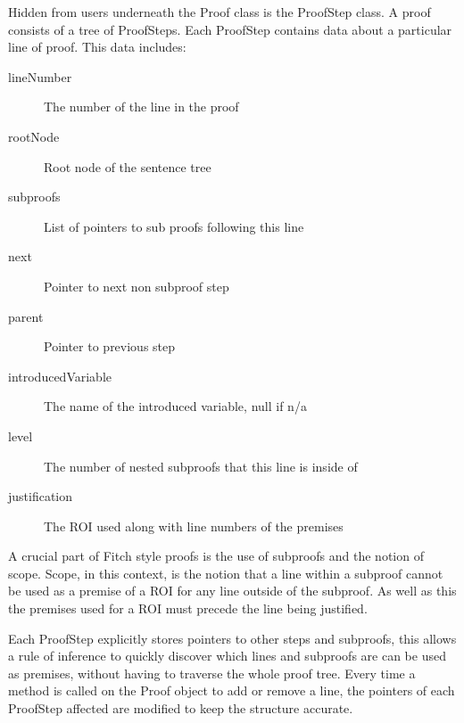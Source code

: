 Hidden from users underneath the Proof class is the ProofStep class. A proof consists of a tree of ProofSteps. Each ProofStep contains data about a particular line of proof. This data includes:
\begin {description}
\item[lineNumber] The number of the line in the proof
\item[rootNode] Root node of the sentence tree
\item[subproofs] List of pointers to sub proofs following this line
\item[next] Pointer to next non subproof step
\item[parent] Pointer to previous step
\item[introducedVariable] The name of the introduced variable, null if n/a
\item[level] The number of nested subproofs that this line is inside of
\item[justification] The ROI used along with line numbers of the premises
\end{description}

 
A crucial part of Fitch style proofs is the use of subproofs and the notion of scope. Scope, in this context, is the notion that a line within a subproof cannot be used as a premise of a ROI for any line outside of the subproof. As well as this the premises used for a ROI must precede the line being justified. 

Each ProofStep explicitly stores pointers to other steps and subproofs, this allows a rule of inference to quickly discover which lines and subproofs are can be used as premises, without having to traverse the whole proof tree. Every time a method is called on the Proof object to add or remove a line, the pointers of each ProofStep affected are modified to keep the structure accurate.